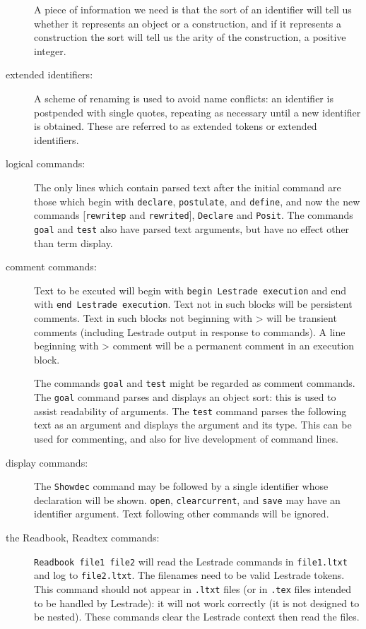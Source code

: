 \documentclass[12pt]{article}
\begin{document}
\begin{description}
A piece of information we need is that the sort of an identifier will tell us whether it represents an object or a construction, and if it represents a construction the sort will tell us the arity of the construction, a positive integer.

\item[extended identifiers:]  A scheme of renaming is used to avoid name conflicts:  an identifier is postpended with single quotes, repeating as necessary until a new identifier is obtained.  These are referred to as extended tokens or extended identifiers.

\item[logical commands:]  The only lines which contain parsed text after the initial command are those which begin with {\tt declare}, {\tt postulate}, and {\tt define}, and now the new commands
[{\tt rewritep} and {\tt rewrited}], {\tt Declare} and {\tt Posit}.  The commands {\tt goal} and {\tt test} also have parsed text arguments, but have no effect other than term display.

\item[comment commands:]  Text to be excuted will begin with {\tt begin Lestrade execution} and end with {\tt end Lestrade execution}.  Text not in such blocks will be persistent comments.
Text in such blocks not beginning with \verb >>>  will be transient comments (including Lestrade output in response to commands).  A line beginning with \verb >>> comment  will be a permanent comment in an execution block.

The commands {\tt goal} and {\tt test} might be regarded as comment commands.  The {\tt goal} command parses and displays an object sort:  this is used to assist readability
of arguments.  The {\tt test} command parses the following text as an argument and displays the argument and its type.  This can be used for commenting, and also for live development of command lines.

\item[display commands:]  The {\tt Showdec} command may be followed by a single identifier whose declaration will be shown.  {\tt open}, {\tt clearcurrent}, and {\tt save} may have an identifier argument.  Text following other commands will be ignored.

\item[the Readbook, Readtex commands:]  {\tt Readbook  file1 file2}  will read the Lestrade commands in {\tt file1.ltxt} and log to {\tt file2.ltxt}.  The filenames need to be valid Lestrade tokens.  This command should not appear in {\tt .ltxt} files (or in {\tt .tex} files intended to be handled by Lestrade):  it will not work correctly (it is not designed to be nested).  These commands clear the Lestrade context then read the files.


\end{description}
\end{document}
